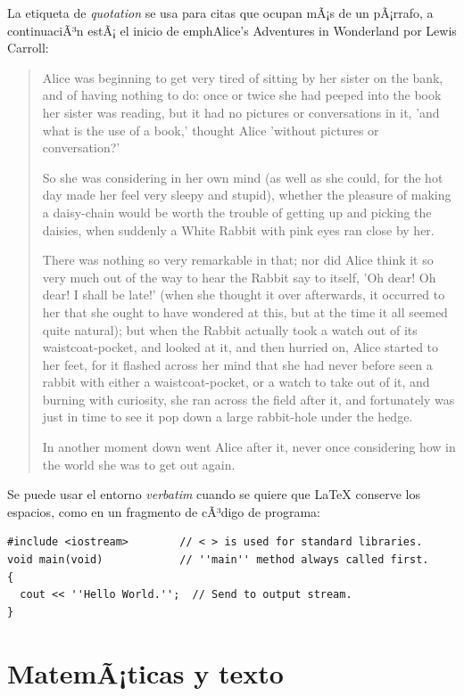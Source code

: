 \documentclass[11pt,spanish]{report}
\begin{document}
La etiqueta de \emph{quotation} se usa para citas que ocupan mÃ¡s de un pÃ¡rrafo, a continuaciÃ³n estÃ¡ el inicio de emph{Alice's Adventures in Wonderland } por
Lewis Carroll:

\begin{quotation}
Alice was beginning to get very tired of sitting by her sister on the bank,
and of having nothing to do: once or twice she had peeped into the book her
sister was reading, but it had no pictures or conversations in it, 'and what
is the use of a book,' thought Alice 'without pictures or conversation?'

So she was considering in her own mind (as well as she could, for the hot day
made her feel very sleepy and stupid), whether the pleasure of making a
daisy-chain would be worth the trouble of getting up and picking the daisies,
when suddenly a White Rabbit with pink eyes ran close by her.

There was nothing so very remarkable in that; nor did Alice think it so very
much out of the way to hear the Rabbit say to itself, 'Oh dear! Oh dear! I
shall be late!' (when she thought it over afterwards, it occurred to her that
she ought to have wondered at this, but at the time it all seemed quite
natural); but when the Rabbit actually took a watch out of its
waistcoat-pocket, and looked at it, and then hurried on, Alice started to her
feet, for it flashed across her mind that she had never before seen a rabbit
with either a waistcoat-pocket, or a watch to take out of it, and burning with
curiosity, she ran across the field after it, and fortunately was just in time
to see it pop down a large rabbit-hole under the hedge.

In another moment down went Alice after it, never once considering how in the
world she was to get out again.
\end{quotation}

Se puede usar el entorno \emph{verbatim} cuando se quiere que \LaTeX {} conserve los espacios, como en un fragmento de cÃ³digo de programa:

\begin{verbatim}
#include <iostream>        // < > is used for standard libraries.
void main(void)            // ''main'' method always called first.
{
  cout << ''Hello World.'';  // Send to output stream.
}
\end{verbatim}

\section{MatemÃ¡ticas y texto}
\end{document}
